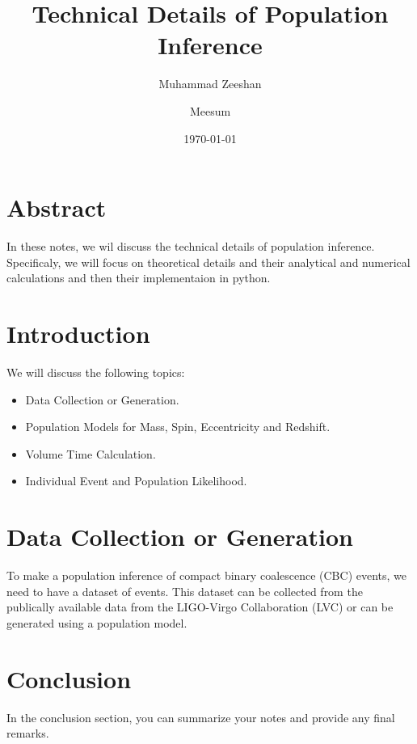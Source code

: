 \documentclass{article}
\title{Technical Details of Population Inference}
\author{Muhammad Zeeshan}
\author{Meesum}
\date{\today}
\begin{document}
\maketitle
\section{Abstract}
In these notes, we wil discuss the technical details of population inference. 
Specificaly, we will focus on theoretical details and their analytical and numerical 
calculations and then their implementaion in python. 

\section{Introduction}
We will discuss the following topics:
\begin{itemize}
    \item Data Collection or Generation.
    \item Population Models for Mass, Spin, Eccentricity and Redshift.
    \item Volume Time Calculation.
    \item Individual Event and Population Likelihood.
\end{itemize}

    
\section{Data Collection or Generation}

To make a population inference of compact binary coalescence (CBC) events, we need to have a dataset of events.
This dataset can be collected from the publically available data from the LIGO-Virgo Collaboration (LVC) or can 
be generated using a population model.



\section{Conclusion}

In the conclusion section, you can summarize your notes and provide any final remarks.

% 
% 
\end{document}
